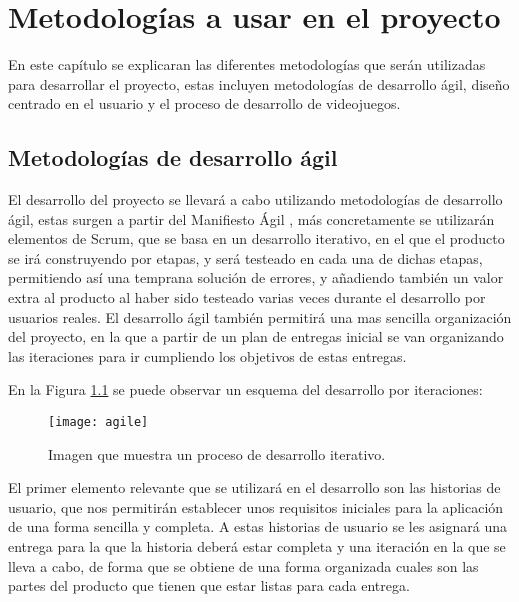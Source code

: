 \chapter{Metodologías a usar en el proyecto}
\label{ch:metodologias}
En este capítulo se explicaran las diferentes metodologías que serán utilizadas para desarrollar el proyecto, estas incluyen metodologías de desarrollo ágil, diseño centrado en el usuario y el proceso de desarrollo de videojuegos.

\section{Metodologías de desarrollo ágil}
El desarrollo del proyecto se llevará a cabo utilizando metodologías de desarrollo ágil, estas surgen a partir del Manifiesto Ágil \cite{beck}, más concretamente se utilizarán elementos de Scrum, que se basa en un desarrollo iterativo, en el que el producto se irá construyendo por etapas, y será testeado en cada una de dichas etapas, permitiendo así una temprana solución de errores, y añadiendo también un valor extra al producto al haber sido testeado varias veces durante el desarrollo por usuarios reales. El desarrollo ágil también permitirá una mas sencilla organización del proyecto, en la que a partir de un plan de entregas inicial se van organizando las iteraciones para ir cumpliendo los objetivos de estas entregas.\\

\newpage

En la Figura \ref{figura-agile} se puede observar un esquema del desarrollo por iteraciones:

\begin{figure}[h]
  \centering
  \texttt{[image: agile]}
  \caption{Imagen que muestra un proceso de desarrollo iterativo.\protect\footnotemark}
  \label{figura-agile}
\end{figure}


El primer elemento relevante que se utilizará en el desarrollo son las historias de usuario, que nos permitirán establecer unos requisitos iniciales para la aplicación de una forma sencilla y completa. A estas historias de usuario se les asignará una entrega para la que la historia deberá estar completa y una iteración en la que se lleva a cabo, de forma que se obtiene de una forma organizada cuales son las partes del producto que tienen que estar listas para cada entrega.\\

